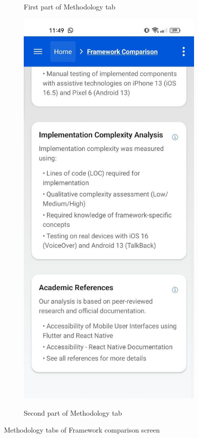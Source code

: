\begin{figure}[ht]
\begin{subfigure}[b]{0.48\textwidth}
        \caption{First part of Methodology tab}
        \label{fig:methodology-1}
    \end{subfigure}
    \hfill
    \begin{subfigure}[b]{0.48\textwidth}
        \centering
        \includegraphics[width=\linewidth, alt={Framework comparison screen with Flutter selected}]{img/methodology2.jpg}
        \caption{Second part of Methodology tab}
        \label{fig:methodology-2}
    \end{subfigure}
    \caption{Methodology tabs of Framework comparison screen}
    \label{fig:methodology_screens_sidebyside}
\end{figure}

